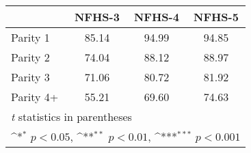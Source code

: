{
\def\sym#1{\ifmmode^{#1}\else\(^{#1}\)\fi}
\begin{tabular}{l*{3}{c}}
\hline\hline
            &\multicolumn{1}{c}{NFHS-3}&\multicolumn{1}{c}{NFHS-4}&\multicolumn{1}{c}{NFHS-5}\\
\hline
\hline
Parity 1    &       85.14         &       94.99         &       94.85         \\
Parity 2    &       74.04         &       88.12         &       88.97         \\
Parity 3    &       71.06         &       80.72         &       81.92         \\
Parity 4+   &       55.21         &       69.60         &       74.63         \\
\hline\hline
\multicolumn{4}{l}{\footnotesize \textit{t} statistics in parentheses}\\
\multicolumn{4}{l}{\footnotesize \sym{*} \(p<0.05\), \sym{**} \(p<0.01\), \sym{***} \(p<0.001\)}\\
\end{tabular}
}
